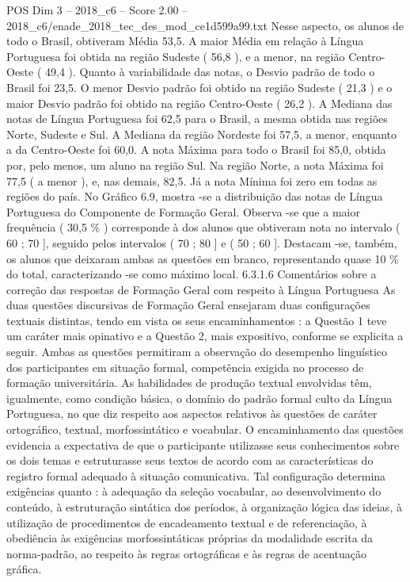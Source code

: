 \begin{textsample}{POS Dim 3 – 2018\_c6 – Score 2.00 – 2018\_c6/enade\_2018\_tec\_des\_mod\_ce1d599a99.txt}
Nesse aspecto, os alunos de todo o Brasil, obtiveram Média 53,5.
A maior Média em relação à Língua Portuguesa foi obtida na região Sudeste ( 56,8 ), e a menor, na região Centro-Oeste ( 49,4 ).
Quanto à variabilidade das notas, o Desvio padrão de todo o Brasil foi 23,5.
O menor Desvio padrão foi obtido na região Sudeste ( 21,3 ) e o maior Desvio padrão foi obtido na região Centro-Oeste ( 26,2 ).
A Mediana das notas de Língua Portuguesa foi 62,5 para o Brasil, a mesma obtida nas regiões Norte, Sudeste e Sul.
A Mediana da região Nordeste foi 57,5, a menor, enquanto a da Centro-Oeste foi 60,0.
A nota Máxima para todo o Brasil foi 85,0, obtida por, pelo menos, um aluno na região Sul.
Na região Norte, a nota Máxima foi 77,5 ( a menor ), e, nas demais, 82,5.
Já a nota Mínima foi zero em todas as regiões do país.
No Gráfico 6.9, mostra -se a distribuição das notas de Língua Portuguesa do Componente de Formação Geral.
Observa -se que a maior frequência ( 30,5 \% ) corresponde à dos alunos que obtiveram nota no intervalo ( 60 ; 70 ], seguido pelos intervalos ( 70 ; 80 ] e ( 50 ; 60 ].
Destacam -se, também, os alunos que deixaram ambas as questões em branco, representando quase 10 \% do total, caracterizando -se como máximo local. 6.3.1.6 Comentários sobre a correção das respostas de Formação Geral com respeito à Língua Portuguesa As duas questões discursivas de Formação Geral ensejaram duas configurações textuais distintas, tendo em vista os seus encaminhamentos : a Questão 1 teve um caráter mais opinativo e a Questão 2, mais expositivo, conforme se explicita a seguir.
Ambas as questões permitiram a observação do desempenho linguístico dos participantes em situação formal, competência exigida no processo de formação universitária.
As habilidades de produção textual envolvidas têm, igualmente, como condição básica, o domínio do padrão formal culto da Língua Portuguesa, no que diz respeito aos aspectos relativos às questões de caráter ortográfico, textual, morfossintático e vocabular.
O encaminhamento das questões evidencia a expectativa de que o participante utilizasse seus conhecimentos sobre os dois temas e estruturasse seus textos de acordo com as características do registro formal adequado à situação comunicativa.
Tal configuração determina exigências quanto : à adequação da seleção vocabular, ao desenvolvimento do conteúdo, à estruturação sintática dos períodos, à organização lógica das ideias, à utilização de procedimentos de encadeamento textual e de referenciação, à obediência às exigências morfossintáticas próprias da modalidade escrita da norma-padrão, ao respeito às regras ortográficas e às regras de acentuação gráfica.

\end{textsample}
